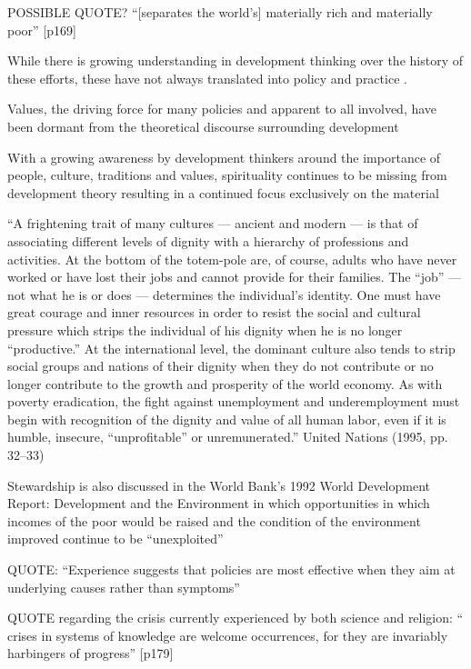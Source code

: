 POSSIBLE QUOTE? “[separates the world's] materially rich and materially poor” [p169] \citep{Arbab2000}

While there is growing understanding in development thinking over the history of these efforts, these have not always translated into policy and practice \citep{Arbab2000}.

Values, the driving force for many policies and apparent to all involved, have been dormant from the theoretical discourse surrounding development \citep{Arbab2000}

With a growing awareness by development thinkers around the importance of people, culture, traditions and values, spirituality continues to be missing from development theory resulting in a continued focus exclusively on the material \citep{Arbab2000}

“A frightening trait of many cultures — ancient and modern — is that of associating different levels of dignity with a hierarchy of professions and activities. At the bottom of the totem-pole are, of course, adults who have never worked or have lost their jobs and cannot provide for their families. The “job” — not what he is or does — determines the individual's identity. One must have great courage and inner resources in order to resist the social and cultural pressure which strips the individual of his dignity when he is no longer “productive.” At the international level, the dominant culture also tends to strip social groups and nations of their dignity when they do not contribute or no longer contribute to the growth and prosperity of the world economy. As with poverty eradication, the fight against unemployment and underemployment must begin with recognition of the dignity and value of all human labor, even if it is humble, insecure, “unprofitable” or unremunerated.” United Nations (1995, pp. 32–33) \citep{Arbab2000}

Stewardship is also discussed in the World Bank's 1992 World Development Report: Development and the Environment in which opportunities in which incomes of the poor would be raised and the condition of the environment improved continue to be “unexploited” \citep{Arbab2000} %

QUOTE: “Experience suggests that policies are most effective when they aim at underlying causes rather than symptoms”  \citep{Arbab2000} %

QUOTE regarding the crisis currently experienced by both science and religion: “ crises in systems of knowledge are welcome occurrences, for they are invariably harbingers of progress” [p179]  \citep{Arbab2000}

